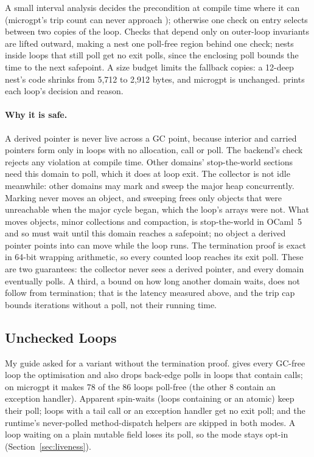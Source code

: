 A small interval analysis decides the precondition at compile time where it
can (microgpt's trip count  can never approach
); otherwise one check on entry selects between two copies of
the loop. Checks that depend only on outer-loop invariants are lifted
outward, making a nest one poll-free region behind one check; nests inside
loops that still poll get no exit polls, since the enclosing poll bounds the
time to the next safepoint. A size budget limits the fallback copies: a
12-deep nest's code shrinks from 5,712 to 2,912 bytes, and microgpt is
unchanged.  prints each loop's decision and reason.

\paragraph{Why it is safe.} A derived pointer is never live across a GC
point, because interior and carried pointers form only in loops with no
allocation, call or poll. The backend's  check rejects any
violation at compile time. Other domains' stop-the-world sections need this
domain to poll, which it does at loop exit. The collector is not idle
meanwhile: other domains may mark and sweep the major heap concurrently.
Marking never moves an object, and sweeping frees only objects that were
unreachable when the major cycle began, which the loop's arrays were not.
What moves objects, minor collections and compaction, is stop-the-world in
OCaml~5 and so must wait until this domain reaches a safepoint; no object a
derived pointer points into can move while the loop runs. The termination proof is exact in 64-bit wrapping
arithmetic, so every counted loop reaches its exit poll. These are two
guarantees: the collector never sees a derived pointer, and every domain
eventually polls. A third, a bound on how long another domain waits, does not
follow from termination; that is the latency measured above, and the trip cap
bounds iterations without a poll, not their running time.

\subsection{Unchecked Loops}
My guide asked for a variant without the termination proof.
 gives every GC-free loop the optimisation and also
drops back-edge polls in loops that contain calls; on microgpt it makes 78 of
the 86 loops poll-free (the other 8 contain an exception handler). Apparent
spin-waits (loops containing  or an atomic) keep their
poll; loops with a tail call or an exception handler get no exit poll; and the
runtime's never-polled method-dispatch helpers are skipped in both modes. A
loop waiting on a plain mutable field loses its poll, so the mode stays opt-in
(Section~\ref{sec:liveness}).

